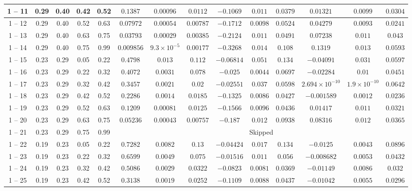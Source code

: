 \begin{longtable}{|*{14}{c|}}
\hline
1 -- 11 & 0.29 & 0.40 & 0.42 & 0.52 & $0.1387$ & $0.00096$ & $0.0112$ & $-0.1069$ & $0.011$ & $0.0379$ & $0.01321$ & $0.0099$ & $0.0304$ \\
\hline
1 -- 12 & 0.29 & 0.40 & 0.52 & 0.63 & $0.07972$ & $0.00054$ & $0.00787$ & $-0.1712$ & $0.0098$ & $0.0524$ & $0.04279$ & $0.0093$ & $0.0241$ \\
\hline
1 -- 13 & 0.29 & 0.40 & 0.63 & 0.75 & $0.03793$ & $0.00029$ & $0.00385$ & $-0.2124$ & $0.011$ & $0.0491$ & $0.07238$ & $0.011$ & $0.043$ \\
\hline
1 -- 14 & 0.29 & 0.40 & 0.75 & 0.99 & $0.009856$ & $9.3\times 10^{-5}$ & $0.00177$ & $-0.3268$ & $0.014$ & $0.108$ & $0.1319$ & $0.013$ & $0.0593$ \\
\hline
1 -- 15 & 0.23 & 0.29 & 0.05 & 0.22 & $0.4798$ & $0.013$ & $0.112$ & $-0.06814$ & $0.051$ & $0.134$ & $-0.04091$ & $0.031$ & $0.0597$ \\
\hline
1 -- 16 & 0.23 & 0.29 & 0.22 & 0.32 & $0.4072$ & $0.0031$ & $0.078$ & $-0.025$ & $0.0044$ & $0.0697$ & $-0.02284$ & $0.01$ & $0.0451$ \\
\hline
1 -- 17 & 0.23 & 0.29 & 0.32 & 0.42 & $0.3457$ & $0.0021$ & $0.02$ & $-0.02551$ & $0.037$ & $0.0598$ & $2.694\times 10^{-10}$ & $1.9\times 10^{-10}$ & $0.0642$ \\
\hline
1 -- 18 & 0.23 & 0.29 & 0.42 & 0.52 & $0.2286$ & $0.0014$ & $0.0185$ & $-0.1325$ & $0.0086$ & $0.0427$ & $-0.001589$ & $0.0012$ & $0.0236$ \\
\hline
1 -- 19 & 0.23 & 0.29 & 0.52 & 0.63 & $0.1209$ & $0.00081$ & $0.0125$ & $-0.1566$ & $0.0096$ & $0.0436$ & $0.01417$ & $0.011$ & $0.0321$ \\
\hline
1 -- 20 & 0.23 & 0.29 & 0.63 & 0.75 & $0.05236$ & $0.00043$ & $0.00757$ & $-0.187$ & $0.012$ & $0.0938$ & $0.08316$ & $0.012$ & $0.0365$ \\
\hline
1 -- 21 & 0.23 & 0.29 & 0.75 & 0.99 & \multicolumn{9}{c|}{Skipped} \\
\hline
1 -- 22 & 0.19 & 0.23 & 0.05 & 0.22 & $0.7282$ & $0.0082$ & $0.13$ & $-0.04424$ & $0.017$ & $0.134$ & $-0.0125$ & $0.0043$ & $0.0896$ \\
\hline
1 -- 23 & 0.19 & 0.23 & 0.22 & 0.32 & $0.6599$ & $0.0049$ & $0.075$ & $-0.01516$ & $0.011$ & $0.056$ & $-0.008682$ & $0.0053$ & $0.0432$ \\
\hline
1 -- 24 & 0.19 & 0.23 & 0.32 & 0.42 & $0.5086$ & $0.0029$ & $0.0322$ & $-0.0823$ & $0.0081$ & $0.0369$ & $-0.01149$ & $0.0086$ & $0.032$ \\
\hline
1 -- 25 & 0.19 & 0.23 & 0.42 & 0.52 & $0.3138$ & $0.0019$ & $0.0252$ & $-0.1109$ & $0.0088$ & $0.0437$ & $-0.01042$ & $0.0055$ & $0.0296$ \\

\end{longtable}
